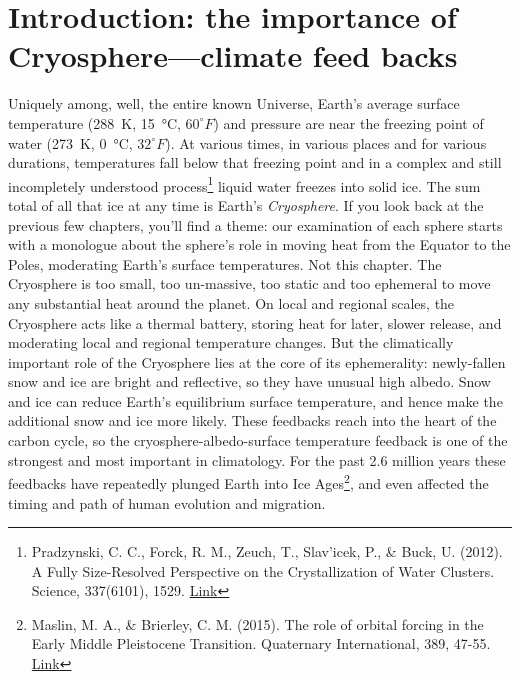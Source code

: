 \section{Introduction: the importance of Cryosphere---climate feed backs} \label{Feedbacks}
Uniquely among, well, the entire known Universe, Earth's average surface temperature (\SI{288}{\kelvin}, \SI{15}{\celsius}, $60^{\circ}F$) and pressure are near the freezing point of water (\SI{273}{\kelvin}, \SI{0}{\celsius}, $32^{\circ}F$). At various times, in various places and for various durations, temperatures fall below that freezing point and in a complex and still incompletely understood process\footnote{Pradzynski, C. C., Forck, R. M., Zeuch, T., Slav'icek, P., \& Buck, U. (2012). A Fully Size-Resolved Perspective on the Crystallization of Water Clusters. Science, 337(6101), 1529. \href{https://doi.org/10.1126/science.1225468}{Link}} liquid water freezes into solid ice. The sum total of all that ice at any time is Earth's \emph{Cryosphere}. If you look back at the previous few chapters, you'll find a theme: our examination of each sphere starts with a monologue about the sphere's role in moving heat from the Equator to the Poles, moderating Earth's surface temperatures. Not this chapter. The Cryosphere is too small, too un-massive, too static and too ephemeral to move any substantial heat around the planet. On local and regional scales, the Cryosphere acts like a thermal battery, storing heat for later, slower release, and moderating local and regional temperature changes. But the climatically important role of the Cryosphere lies at the core of its ephemerality: newly-fallen snow and ice are bright and reflective, so they have unusual high albedo. Snow and ice can reduce Earth's equilibrium surface temperature, and hence make the additional snow and ice more likely. These feedbacks reach into the heart of the carbon cycle, so the cryosphere-albedo-surface temperature feedback is one of the strongest and most important in climatology. For the past 2.6 million years these feedbacks have repeatedly plunged Earth into Ice Ages\footnote{Maslin, M. A., \& Brierley, C. M. (2015). The role of orbital forcing in the Early Middle Pleistocene Transition. Quaternary International, 389, 47-55. \href{https://doi.org/10.1016/j.quaint.2015.01.047}{Link}}, and even affected the timing and path of human evolution and migration.\\

